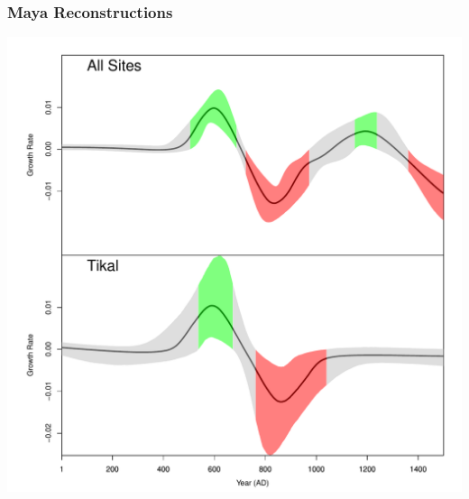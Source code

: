 \documentclass{beamer}
\begin{document}
\begin{frame}[t]
  \frametitle{Maya Reconstructions}
    \includegraphics[height=.85\textheight]{Fig4_maya_inference_rate_K10.pdf}
\end{frame}
\end{document}
